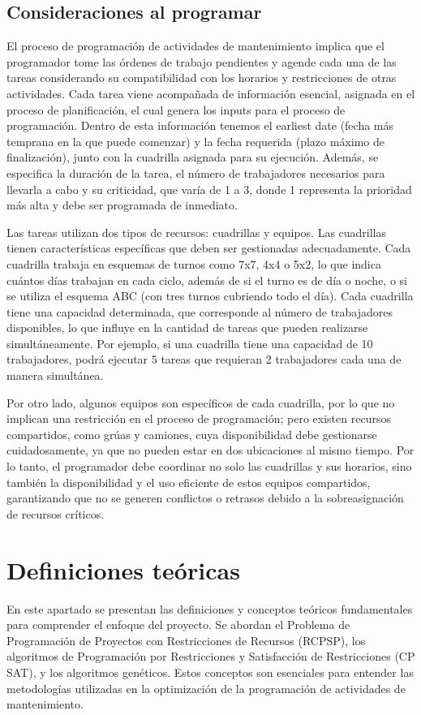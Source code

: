 \documentclass{article}
\begin{document}
\subsection{Consideraciones al programar}
El proceso de programación de actividades de mantenimiento implica que el programador tome las órdenes de trabajo pendientes y agende cada una de las tareas considerando su compatibilidad con los horarios y restricciones de otras actividades. Cada tarea viene acompañada de información esencial, asignada en el proceso de planificación, el cual genera los inputs para el proceso de programación. Dentro de esta información tenemos el earliest date (fecha más temprana en la que puede comenzar) y la fecha requerida (plazo máximo de finalización), junto con la cuadrilla asignada para su ejecución. Además, se especifica la duración de la tarea, el número de trabajadores necesarios para llevarla a cabo y su criticidad, que varía de 1 a 3, donde 1 representa la prioridad más alta y debe ser programada de inmediato.

Las tareas utilizan dos tipos de recursos: cuadrillas y equipos. Las cuadrillas tienen características específicas que deben ser gestionadas adecuadamente. Cada cuadrilla trabaja en esquemas de turnos como 7x7, 4x4 o 5x2, lo que indica cuántos días trabajan en cada ciclo, además de si el turno es de día o noche, o si se utiliza el esquema ABC (con tres turnos cubriendo todo el día). Cada cuadrilla tiene una capacidad determinada, que corresponde al número de trabajadores disponibles, lo que influye en la cantidad de tareas que pueden realizarse simultáneamente. Por ejemplo, si una cuadrilla tiene una capacidad de 10 trabajadores, podrá ejecutar 5 tareas que requieran 2 trabajadores cada una de manera simultánea.

Por otro lado, algunos equipos son específicos de cada cuadrilla, por lo que no implican una restricción en el proceso de programación; pero existen recursos compartidos, como grúas y camiones, cuya disponibilidad debe gestionarse cuidadosamente, ya que no pueden estar en dos ubicaciones al mismo tiempo. Por lo tanto, el programador debe coordinar no solo las cuadrillas y sus horarios, sino también la disponibilidad y el uso eficiente de estos equipos compartidos, garantizando que no se generen conflictos o retrasos debido a la sobreasignación de recursos críticos.

\section{Definiciones teóricas}
En este apartado se presentan las definiciones y conceptos teóricos fundamentales para comprender el enfoque del proyecto. Se abordan el Problema de Programación de Proyectos con Restricciones de Recursos (RCPSP), los algoritmos de Programación por Restricciones y Satisfacción de Restricciones (CP SAT), y los algoritmos genéticos. Estos conceptos son esenciales para entender las metodologías utilizadas en la optimización de la programación de actividades de mantenimiento.
\end{document}
